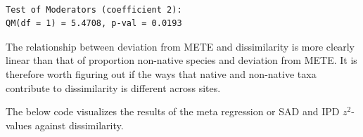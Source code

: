 \documentclass[
  letterpaper,
  DIV=11,
  numbers=noendperiod]{scrartcl}
\newenvironment{Shaded}{\begin{snugshade}}{\end{snugshade}}
\newcommand{\AttributeTok}[1]{\textcolor[rgb]{0.40,0.45,0.13}{#1}}
\newcommand{\CommentTok}[1]{\textcolor[rgb]{0.37,0.37,0.37}{#1}}
\newcommand{\DecValTok}[1]{\textcolor[rgb]{0.68,0.00,0.00}{#1}}
\newcommand{\FunctionTok}[1]{\textcolor[rgb]{0.28,0.35,0.67}{#1}}
\newcommand{\NormalTok}[1]{\textcolor[rgb]{0.00,0.23,0.31}{#1}}
\newcommand{\OtherTok}[1]{\textcolor[rgb]{0.00,0.23,0.31}{#1}}
\newcommand{\SpecialCharTok}[1]{\textcolor[rgb]{0.37,0.37,0.37}{#1}}
\newcommand{\StringTok}[1]{\textcolor[rgb]{0.13,0.47,0.30}{#1}}
\begin{document}
\begin{verbatim}

Test of Moderators (coefficient 2):
QM(df = 1) = 5.4708, p-val = 0.0193
\end{verbatim}

The relationship between deviation from METE and dissimilarity is more
clearly linear than that of proportion non-native species and deviation
from METE. It is therefore worth figuring out if the ways that native
and non-native taxa contribute to dissimilarity is different across
sites.

The below code visualizes the results of the meta regression or SAD and
IPD \(z^2\)-values against dissimilarity.

\begin{Shaded}
\end{Shaded}
\end{document}
